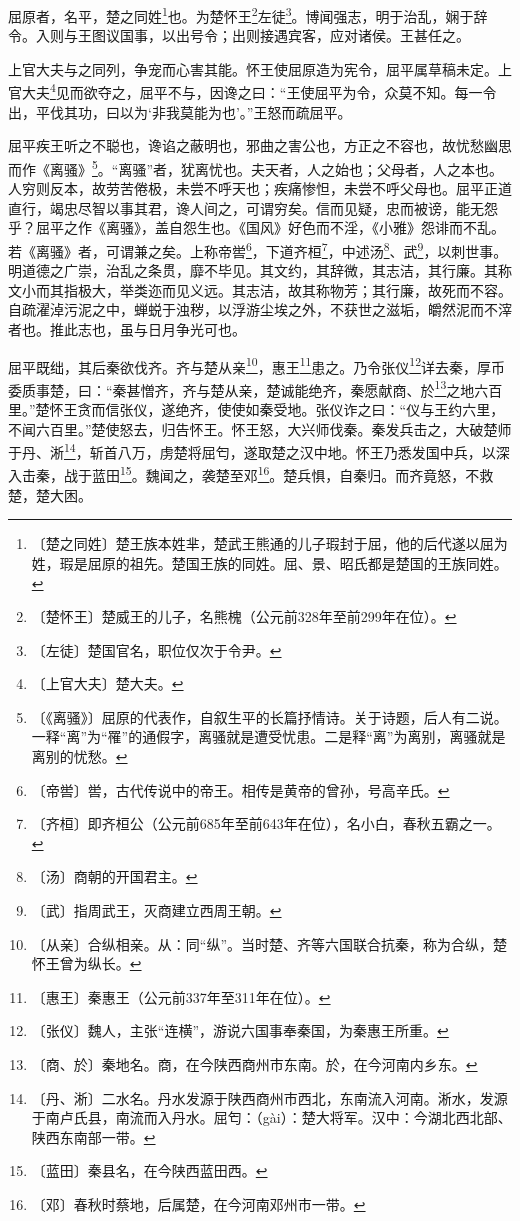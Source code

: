 \documentclass[12pt,UTF-8,openany]{ctexbook}
\begin{document}
\begin{normalsize}
    
    屈原者，名平，楚之同姓\footnote{〔楚之同姓〕楚王族本姓芈，楚武王熊通的儿子瑕封于屈，他的后代遂以屈为姓，瑕是屈原的祖先。楚国王族的同姓。屈、景、昭氏都是楚国的王族同姓。}也。为楚怀王\footnote{〔楚怀王〕楚威王的儿子，名熊槐（公元前328年至前299年在位）。}左徒\footnote{〔左徒〕楚国官名，职位仅次于令尹。}。博闻强志，明于治乱，娴于辞令。入则与王图议国事，以出号令；出则接遇宾客，应对诸侯。王甚任之。
    
    上官大夫与之同列，争宠而心害其能。怀王使屈原造为宪令，屈平属草稿未定。上官大夫\footnote{〔上官大夫〕楚大夫。}见而欲夺之，屈平不与，因谗之曰：“王使屈平为令，众莫不知。每一令出，平伐其功，曰以为‘非我莫能为也’。”王怒而疏屈平。
    
    屈平疾王听之不聪也，谗谄之蔽明也，邪曲之害公也，方正之不容也，故忧愁幽思而作《离骚》\footnote{〔《离骚》〕屈原的代表作，自叙生平的长篇抒情诗。关于诗题，后人有二说。一释“离”为“罹”的通假字，离骚就是遭受忧患。二是释“离”为离别，离骚就是离别的忧愁。}。“离骚”者，犹离忧也。夫天者，人之始也；父母者，人之本也。人穷则反本，故劳苦倦极，未尝不呼天也；疾痛惨怛，未尝不呼父母也。屈平正道直行，竭忠尽智以事其君，谗人间之，可谓穷矣。信而见疑，忠而被谤，能无怨乎？屈平之作《离骚》，盖自怨生也。《国风》好色而不淫，《小雅》怨诽而不乱。若《离骚》者，可谓兼之矣。上称帝喾\footnote{〔帝喾〕喾，古代传说中的帝王。相传是黄帝的曾孙，号高辛氏。}，下道齐桓\footnote{〔齐桓〕即齐桓公（公元前685年至前643年在位），名小白，春秋五霸之一。}，中述汤\footnote{〔汤〕商朝的开国君主。}、武\footnote{〔武〕指周武王，灭商建立西周王朝。}，以刺世事。明道德之广崇，治乱之条贯，靡不毕见。其文约，其辞微，其志洁，其行廉。其称文小而其指极大，举类迩而见义远。其志洁，故其称物芳；其行廉，故死而不容。自疏濯淖污泥之中，蝉蜕于浊秽，以浮游尘埃之外，不获世之滋垢，皭然泥而不滓者也。推此志也，虽与日月争光可也。
    
    屈平既绌，其后秦欲伐齐。齐与楚从亲\footnote{〔从亲〕合纵相亲。从：同“纵”。当时楚、齐等六国联合抗秦，称为合纵，楚怀王曾为纵长。}，惠王\footnote{〔惠王〕秦惠王（公元前337年至311年在位）。}患之。乃令张仪\footnote{〔张仪〕魏人，主张“连横”，游说六国事奉秦国，为秦惠王所重。}详去秦，厚币委质事楚，曰：“秦甚憎齐，齐与楚从亲，楚诚能绝齐，秦愿献商、於\footnote{〔商、於〕秦地名。商，在今陕西商州市东南。於，在今河南内乡东。}之地六百里。”楚怀王贪而信张仪，遂绝齐，使使如秦受地。张仪诈之曰：“仪与王约六里，不闻六百里。”楚使怒去，归告怀王。怀王怒，大兴师伐秦。秦发兵击之，大破楚师于丹、淅\footnote{〔丹、淅〕二水名。丹水发源于陕西商州市西北，东南流入河南。淅水，发源于南卢氏县，南流而入丹水。屈匄：（gài）：楚大将军。汉中：今湖北西北部、陕西东南部一带。}，斩首八万，虏楚将屈匄，遂取楚之汉中地。怀王乃悉发国中兵，以深入击秦，战于蓝田\footnote{〔蓝田〕秦县名，在今陕西蓝田西。}。魏闻之，袭楚至邓\footnote{〔邓〕春秋时蔡地，后属楚，在今河南邓州市一带。}。楚兵惧，自秦归。而齐竟怒，不救楚，楚大困。
    

\end{normalsize}
\end{document}
